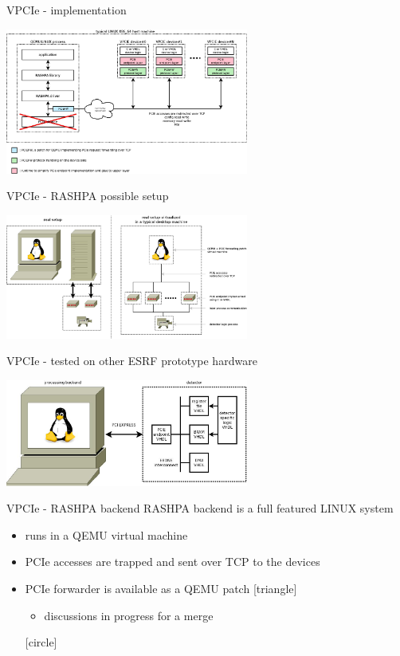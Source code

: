 \documentclass{beamer}
\begin{document}
\begin{frame}{VPCIe - implementation}
  \begin{center}
  \includegraphics[width=80mm]{pic/dv_implem/main.jpeg}
  \end{center}
\end{frame}

\begin{frame}{VPCIe - RASHPA possible setup}
  \begin{center}
  \includegraphics[width=80mm]{pic/dv_vpcie/main.jpeg}
  \end{center}
\end{frame}

\begin{frame}{VPCIe - tested on other ESRF prototype hardware}
  \begin{center}
  \includegraphics[width=80mm]{pic/dv_ebone/main.jpeg}
  \end{center}
\end{frame}

\begin{frame}{VPCIe - RASHPA backend}
  RASHPA backend is a full featured LINUX system
  \begin{itemize}
  \item runs in a QEMU virtual machine
  \item PCIe accesses are trapped and sent over TCP to the devices
  \item PCIe forwarder is available as a QEMU patch
    [triangle]
    \begin{itemize}
    \item discussions in progress for a merge
    \end{itemize}
    [circle]
  \end{itemize}
\end{frame}
\end{document}

